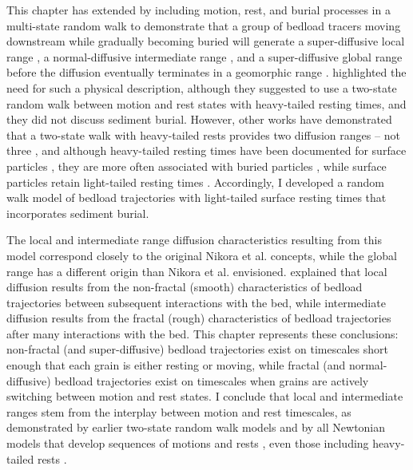 This chapter has extended \citet{Einstein1937} by including motion, rest, and burial processes in a multi-state random walk \citep{Weiss1994,Weeks1998} to demonstrate that a group of bedload tracers moving downstream while gradually becoming buried will generate a super-diffusive local range \citep{Martin2012,Fathel2016,Witz2018}, a normal-diffusive intermediate range \citep{Nakagawa1976,Yano1969}, and a super-diffusive global range \citep{Bradley2017, Bradley2010} before the diffusion eventually terminates in a geomorphic range \citep{Hassan2017}.
\citet{Nikora2002} highlighted the need for such a physical description, although they suggested to use a two-state random walk between motion and rest states with heavy-tailed resting times, and they did not discuss sediment burial.
However, other works have demonstrated that a two-state walk with heavy-tailed rests provides two diffusion ranges -- not three \citep{Weeks1996,Fan2016}, and although heavy-tailed resting times have been documented for surface particles \citep{Liu2019,Fraccarollo2019}, they are more often associated with buried particles \citep{Martin2012,Martin2014,Voepel2013,Olinde2015,Pelosi2016, Pierce2020a}, while surface particles retain light-tailed resting times \citep{Einstein1937,Yano1969,Ancey2006,Nakagawa1976}.
Accordingly, I developed a random walk model of bedload trajectories with light-tailed surface resting times that incorporates sediment burial.

The local and intermediate range diffusion characteristics resulting from this model correspond closely to the original Nikora et al. concepts, while the global range has a different origin than Nikora et al. envisioned.
\citet{Nikora2001a} explained that local diffusion results from the non-fractal (smooth) characteristics of bedload trajectories between subsequent interactions with the bed,  while intermediate diffusion results from the fractal (rough) characteristics of bedload trajectories after many interactions with the bed.
This chapter represents these conclusions: non-fractal (and super-diffusive) bedload trajectories exist on timescales short enough that each grain is either resting or moving, while fractal (and normal-diffusive) bedload trajectories exist on timescales when grains are actively switching between motion and rest states.
I conclude that local and intermediate ranges stem from the interplay between motion and rest timescales, as demonstrated by earlier two-state random walk models \citep{Lisle1998,Lajeunesse2017} and by all Newtonian models that develop sequences of motions and rests \citep{Nikora2001a, Bialik2012}, even those including heavy-tailed rests \citep{Fan2016}.

